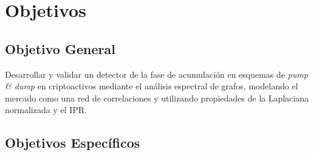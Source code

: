 \section{Objetivos}

\subsection{Objetivo General}

Desarrollar y validar un detector de la fase de acumulación en esquemas de \emph{pump \& dump} en criptoactivos mediante el análisis espectral de grafos, modelando el mercado como una red de correlaciones y utilizando propiedades de la Laplaciana normalizada y el IPR.

\subsection{Objetivos Específicos}

